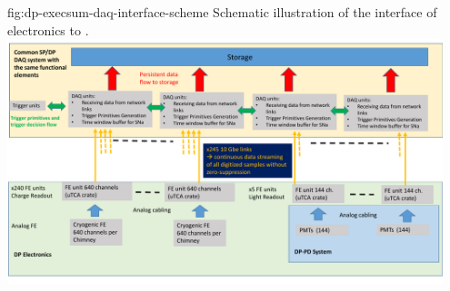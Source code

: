 \begin{dunefigure}{fig:dp-execsum-daq-interface-scheme}
{Schematic illustration of the interface of   electronics to .}
\includegraphics[width=0.95\textwidth]{graphics/dp-tpcelec-daq-interface-scheme}
\end{dunefigure}

